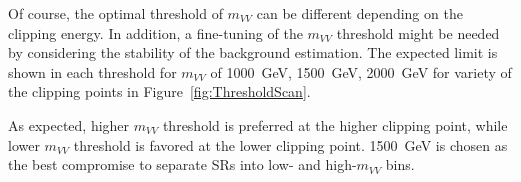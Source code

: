 \begin{table}[ht!]
\small
\begin{center}
\caption{Expected signal strength and limits in every two options. only \tlep~channel is used for the fit. The result for single bin fit with RNN is also shown as a reference. The normalization fitted for the standard model signal, and Z backgrounds are shown as Norm in the table.}
\label{tab:2binlimit}
\end{center}
\end{table}

Of course, the optimal threshold of $m_{VV}$ can be different depending on the clipping energy.
In addition, a fine-tuning of the $m_{VV}$ threshold might be needed by considering the stability of the background estimation.
The expected limit is shown in each threshold for $m_{VV}$ of 1000~GeV, 1500~GeV, 2000~GeV for variety of the clipping points in Figure~\ref{fig:ThresholdScan}.

As expected, higher $m_{VV}$ threshold is preferred at the higher clipping point, while lower $m_{VV}$ threshold is favored at the lower clipping point.
1500~GeV is chosen as the best compromise to separate SRs into low- and high-$m_{VV}$ bins.

